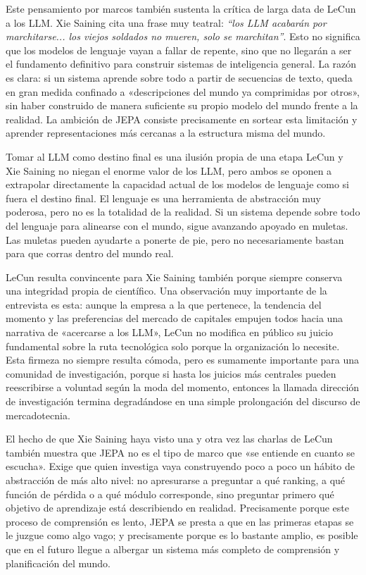\documentclass[a4paper,12pt]{article}
\begin{document}
Este pensamiento por marcos también sustenta la crítica de larga data de LeCun a los LLM. Xie Saining cita una frase muy teatral: \textit{``los LLM acabarán por marchitarse... los viejos soldados no mueren, solo se marchitan''}. Esto no significa que los modelos de lenguaje vayan a fallar de repente, sino que no llegarán a ser el fundamento definitivo para construir sistemas de inteligencia general. La razón es clara: si un sistema aprende sobre todo a partir de secuencias de texto, queda en gran medida confinado a «descripciones del mundo ya comprimidas por otros», sin haber construido de manera suficiente su propio modelo del mundo frente a la realidad. La ambición de JEPA consiste precisamente en sortear esta limitación y aprender representaciones más cercanas a la estructura misma del mundo.

\begin{warningbox}{Tomar al LLM como destino final es una ilusión propia de una etapa}
LeCun y Xie Saining no niegan el enorme valor de los LLM, pero ambos se oponen a extrapolar directamente la capacidad actual de los modelos de lenguaje como si fuera el destino final. El lenguaje es una herramienta de abstracción muy poderosa, pero no es la totalidad de la realidad. Si un sistema depende sobre todo del lenguaje para alinearse con el mundo, sigue avanzando apoyado en muletas. Las muletas pueden ayudarte a ponerte de pie, pero no necesariamente bastan para que corras dentro del mundo real.
\end{warningbox}

LeCun resulta convincente para Xie Saining también porque siempre conserva una integridad propia de científico. Una observación muy importante de la entrevista es esta: aunque la empresa a la que pertenece, la tendencia del momento y las preferencias del mercado de capitales empujen todos hacia una narrativa de «acercarse a los LLM», LeCun no modifica en público su juicio fundamental sobre la ruta tecnológica solo porque la organización lo necesite. Esta firmeza no siempre resulta cómoda, pero es sumamente importante para una comunidad de investigación, porque si hasta los juicios más centrales pueden reescribirse a voluntad según la moda del momento, entonces la llamada dirección de investigación termina degradándose en una simple prolongación del discurso de mercadotecnia.

El hecho de que Xie Saining haya visto una y otra vez las charlas de LeCun también muestra que JEPA no es el tipo de marco que «se entiende en cuanto se escucha». Exige que quien investiga vaya construyendo poco a poco un hábito de abstracción de más alto nivel: no apresurarse a preguntar a qué ranking, a qué función de pérdida o a qué módulo corresponde, sino preguntar primero qué objetivo de aprendizaje está describiendo en realidad. Precisamente porque este proceso de comprensión es lento, JEPA se presta a que en las primeras etapas se le juzgue como algo vago; y precisamente porque es lo bastante amplio, es posible que en el futuro llegue a albergar un sistema más completo de comprensión y planificación del mundo.
\end{document}
